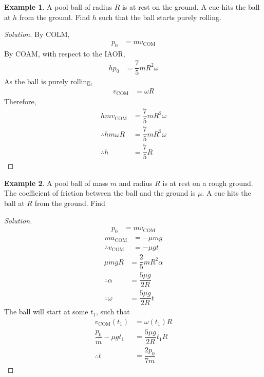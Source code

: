 \documentclass[fleqn, a4paper, 12pt]{article}
\theoremstyle{definition}
\newtheorem{example}{Example}
\theoremstyle{theorem}
\newenvironment{solution}
{\begin{proof}[Solution]\let\qed\relax}
	{\end{proof}}
\begin{document}
\begin{example}
	A pool ball of radius $R$ is at rest on the ground. A cue hits the ball at $h$ from the ground. Find $h$ such that the ball starts purely rolling.
\end{example}

\begin{solution}
	By COLM,
	\begin{align*}
		p_0 &= m v_{\text{COM}}
	\end{align*}
	By COAM, with respect to the IAOR,
	\begin{align*}
		h p_0 &= \dfrac{7}{5} m R^2 \omega
	\end{align*}
	As the ball is purely rolling,
	\begin{align*}
		v_{\text{COM}} &= \omega R
	\end{align*}
	Therefore,
	\begin{align*}
		h m v_{\text{COM}} &= \dfrac{7}{5} m R^2 \omega\\
		\therefore h m \omega R &= \dfrac{7}{5} m R^2 \omega\\
		\therefore h &= \dfrac{7}{5} R
	\end{align*}
\end{solution}

\begin{example}
	A pool ball of mass $m$ and radius $R$ is at rest on a rough ground. The coefficient of friction between the ball and the ground is $\mu$. A cue hits the ball at $R$ from the ground. Find 
\end{example}

\begin{solution}
	\begin{align*}
		p_0 &= m v_{\text{COM}}
	\end{align*}
	\begin{align*}
		m a_{\text{COM}} &= -\mu m g\\
		\therefore v_{\text{COM}} &= -\mu g t
	\end{align*}
	\begin{align*}
		\mu m g R &= \dfrac{2}{5} m R^2 \alpha\\
		\therefore \alpha &= \dfrac{5 \mu g}{2 R}\\
		\therefore \omega &= \dfrac{5 \mu g}{2 R} t
	\end{align*}
	The ball will start at some $t_1$, such that
	\begin{align*}
		v_{\text{COM}}(t_1) &= \omega(t_1) R\\
		\dfrac{p_0}{m} - \mu g t_1 &= \dfrac{5 \mu g }{2 R} t_1 R\\
		\therefore t &= \dfrac{2 p_0}{7 m}
	\end{align*}
\end{solution}
\end{document}
